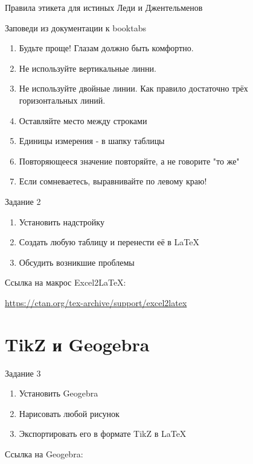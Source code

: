 \documentclass[aspectratio=169]{beamer} %
\begin{document}
\begin{frame}{Правила этикета для истиных Леди и Джентельменов} 
\begin{block}{Заповеди из документации к booktabs}
\begin{enumerate}
\item Будьте проще! Глазам должно быть комфортно.
\item Не используйте вертикальные линни.
\item Не используйте двойные линии. Как правило достаточно трёх горизонтальных линий.
\item Оставляйте место между строками
\item Единицы измерения - в шапку таблицы
\item Повторяющееся значение повторяйте, а не говорите "то же"
\item Если сомневаетесь, выравнивайте по левому краю!
\end{enumerate}
\end{block}
\end{frame}


\begin{frame}[plain]{Задание 2} 

\begin{enumerate}
	\item  Установить надстройку
	\item  Создать любую таблицу и перенести её в \LaTeX
	\item  Обсудить возникшие проблемы 
\end{enumerate}

\begin{block}{Ссылка на макрос Excel2LaTeX:}
	\vspace{3mm}
	\centerline {\url{https://ctan.org/tex-archive/support/excel2latex}}
	\vspace{3mm}
\end{block}
\end{frame}


\section{TikZ и Geogebra} 

\begin{frame}[plain]{Задание 3} 

\begin{enumerate}
	\item  Установить Geogebra
	\item  Нарисовать любой рисунок
	\item  Экспортировать его в формате TikZ в \LaTeX
\end{enumerate}

\begin{block}{Ссылка на Geogebra:}
	\vspace{3mm}
	\centerline {\url{    }}
	\vspace{3mm}
\end{block}
\end{frame}
\end{document}
